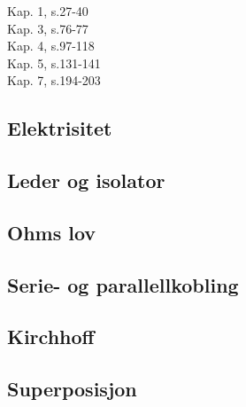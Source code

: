 Kap. 1, s.27-40 \\
Kap. 3, s.76-77 \\
Kap. 4, s.97-118 \\
Kap. 5, s.131-141 \\
Kap. 7, s.194-203

\subsection{Elektrisitet}




\subsection{Leder og isolator}



\subsection{Ohms lov}


\subsection{Serie- og parallellkobling}


\subsection{Kirchhoff}


\subsection{Superposisjon}

